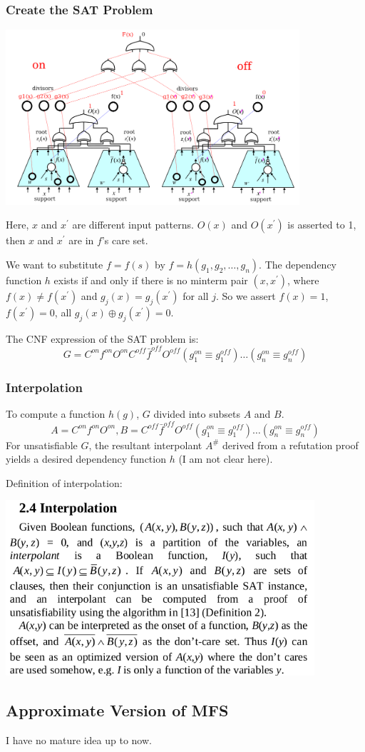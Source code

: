 \documentclass{article}
\begin{document}
\subsubsection{Create the SAT Problem}
\begin{center}
\includegraphics[height=6.5cm]{./sat.png}
\end{center}
Here,
$x$ and $x^\prime$ are different input patterns.
$O(x)$ and $O(x^\prime)$ is asserted to 1,
then $x$ and $x^\prime$ are in $f$'s care set.

\noindent We want to substitute $f = f(s)$ by $f = h(g_1, g_2, \dots, g_n)$.
The dependency function $h$ exists if and only if there is no minterm pair $(x, x^\prime)$,
where $f(x) \neq f(x^\prime)$ and $g_j(x) = g_j(x^\prime)$ for all $j$.
So we assert $f(x) = 1$, $f(x^\prime) = 0$,
all $g_j(x) \oplus g_j(x^\prime) = 0$.

\noindent The CNF expression of the SAT problem is:
\[G = C^{on} f^{on} O^{on} C^{off} \bar f^{off} O^{off} (g_1^{on} \equiv g_1^{off}) \dots (g_n^{on} \equiv g_n^{off})\]

\subsubsection{Interpolation}
To compute a function $h(g)$,
$G$ divided into subsets $A$ and $B$.
\[
    A = C^{on} f^{on} O^{on},
    B = C^{off} \bar f^{off} O^{off} (g_1^{on} \equiv g_1^{off}) \dots (g_n^{on} \equiv g_n^{off})
\]
For unsatisfiable $G$,
the resultant interpolant $A^{\#}$ derived from a refutation proof yields a desired dependency function $h$ (I am not clear here).

Definition of interpolation:
\begin{center}
\includegraphics[height=6.5cm]{./interpolation.png}
\end{center}


\subsection{Approximate Version of MFS}
I have no mature idea up to now.
\end{document}
